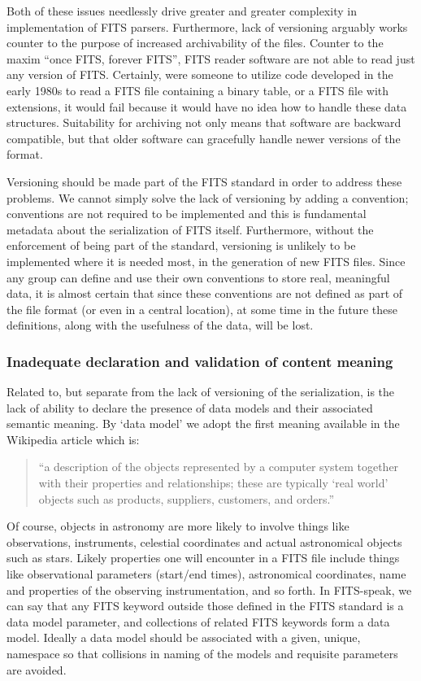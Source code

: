 \documentclass[final,authoryear,5p,times,twocolumn]{elsarticle}
\begin{document}
Both of these issues needlessly drive greater and greater complexity
in implementation of FITS parsers. Furthermore, lack of versioning
arguably works counter to the purpose of increased archivability of
the files. Counter to the maxim ``once FITS, forever FITS'', FITS reader
software are not able to read just any version of FITS. Certainly,
were someone to utilize code developed in the early 1980s to read a
FITS file containing a binary table, or a FITS file with extensions,
it would fail because it would have no idea how to handle these data
structures. Suitability for archiving not only means that software are
backward compatible, but that older software can gracefully handle
newer versions of the format.


Versioning should be made part of the FITS standard in order to
address these problems. We cannot simply solve the lack of versioning
by adding a convention; conventions are not required to be implemented
and this is fundamental metadata about the serialization of FITS
itself. Furthermore, without the enforcement of being part of the
standard, versioning is unlikely to be implemented where it is needed
most, in the generation of new FITS files. Since any group can define
and use their own conventions to store real, meaningful data, it is
almost certain that since these conventions are not defined as part of
the file format (or even in a central location), at some time in the
future these definitions, along with the usefulness of the data, will
be lost.


\subsubsection{Inadequate declaration and validation of content meaning}


Related to, but separate from the lack of versioning of the
serialization, is the lack of ability to declare the presence of data
models and their associated semantic meaning.  By `data model' we
adopt the first meaning available in the Wikipedia article which is:

\begin{quote}
``a description of the objects represented by a computer system
together with their properties and relationships; these are typically
`real world' objects such as products, suppliers, customers, and
orders.''
\end{quote}


Of course, objects in astronomy are more likely to involve things like
observations, instruments, celestial coordinates and actual astronomical
objects such as stars. Likely properties one will encounter in a FITS
file include things like observational parameters (start/end times),
astronomical coordinates, name and properties of the observing
instrumentation, and so forth. In FITS-speak, we can say that any FITS
keyword outside those defined in the FITS standard is a data model
parameter, and collections of related FITS keywords form a data model.
Ideally a data model should be associated with a given, unique,
namespace so that collisions in naming of the models and requisite
parameters are avoided.
\end{document}
